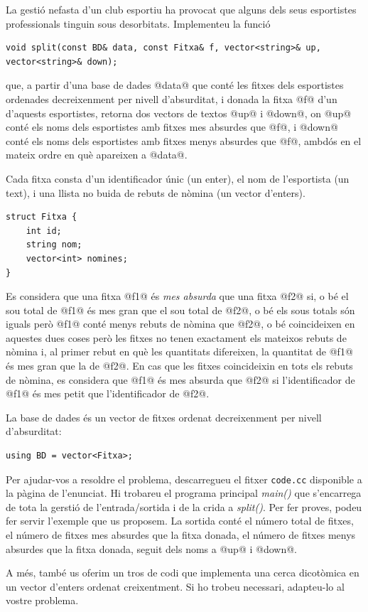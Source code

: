 

\Statement

La gestió nefasta d'un club esportiu ha provocat que alguns dels seus
esportistes professionals tinguin sous desorbitats. Implementeu la
funció
\begin{lstlisting}
void split(const BD& data, const Fitxa& f, vector<string>& up, vector<string>& down);
\end{lstlisting}
que, a partir d'una base de dades @data@ que conté les fitxes dels
esportistes ordenades decreixenment per nivell d'absurditat, i donada
la fitxa @f@ d'un d'aquests esportistes, retorna dos vectors de textos
@up@ i @down@, on @up@ conté els noms dels esportistes amb fitxes mes
absurdes que @f@, i @down@ conté els noms dels esportistes amb fitxes
menys absurdes que @f@, ambdós en el mateix ordre en què apareixen a
@data@.  \bigskip

Cada fitxa consta d'un identificador únic (un enter), el nom de
l'esportista (un text), i una llista no buida de rebuts de nòmina (un
vector d'enters).

\begin{lstlisting}
struct Fitxa {
    int id;
    string nom;
    vector<int> nomines;
}
\end{lstlisting}


Es considera que una fitxa @f1@ és \emph{mes absurda} que una fitxa
@f2@ si, o bé el sou total de @f1@ és mes gran que el sou total de
@f2@, o bé els sous totals són iguals però @f1@ conté menys rebuts de
nòmina que @f2@, o bé coincideixen en aquestes dues coses però les
fitxes no tenen exactament els mateixos rebuts de nòmina i, al primer
rebut en què les quantitats difereixen, la quantitat de @f1@ és mes
gran que la de @f2@. En cas que les fitxes coincideixin en tots els
rebuts de nòmina, es considera que @f1@ és mes absurda que @f2@ si
l'identificador de @f1@ és mes petit que l'identificador de @f2@.
\bigskip

La base de dades és un vector de fitxes ordenat decreixenment per
nivell d'absurditat:

\begin{lstlisting}
using BD = vector<Fitxa>;
\end{lstlisting}


Per ajudar-vos a resoldre el problema, descarregueu el fitxer \texttt{code.cc}
disponible a la pàgina de l'enunciat. Hi trobareu el programa principal \textit{main()}
que s'encarrega de tota la gerstió de l'entrada/sortida i de la crida a \textit{split()}.
Per fer proves, podeu fer servir
l'exemple que us proposem. La sortida conté el número total de fitxes,
el número de fitxes mes absurdes que la fitxa donada, el número de
fitxes menys absurdes que la fitxa donada, seguit dels noms a @up@ i
@down@.

\medskip

A més, també us oferim un tros de codi que implementa una cerca dicotòmica en un vector d'enters ordenat creixentment. Si ho trobeu necessari, adapteu-lo al vostre problema.

\clearpage
\SampleOneCol
